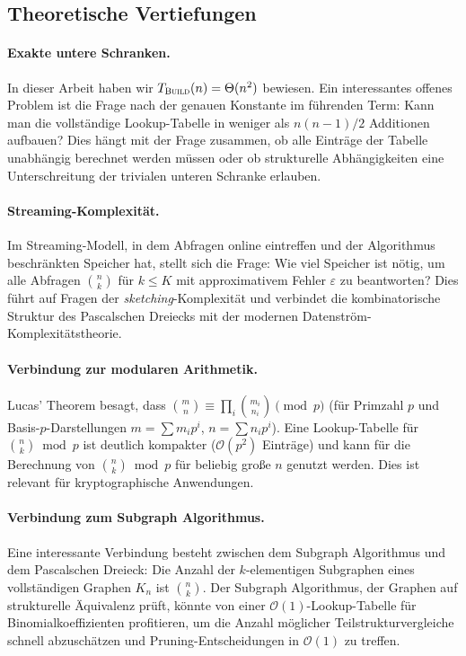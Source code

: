 ﻿\documentclass[12pt, a4paper]{article}
\newcommand{\Oh}{\mathcal{O}}
\newcommand{\build}{\textsc{Build}}
\theoremstyle{plain}
\theoremstyle{definition}
\theoremstyle{remark}
\renewcommand{\Oh}{\mathcal{O}}
\renewcommand{\build}{\textsc{Build}}
\begin{document}
\subsection{Theoretische Vertiefungen}

\paragraph{Exakte untere Schranken.}
In dieser Arbeit haben wir $T_{\build}(n) = \Theta(n^2)$ bewiesen.
Ein interessantes offenes Problem ist die Frage nach der genauen
Konstante im führenden Term: Kann man die vollständige Lookup-Tabelle
in weniger als $n(n-1)/2$ Additionen aufbauen? Dies hängt mit der
Frage zusammen, ob alle Einträge der Tabelle unabhängig berechnet
werden müssen oder ob strukturelle Abhängigkeiten eine Unterschreitung
der trivialen unteren Schranke erlauben.

\paragraph{Streaming-Komplexität.}
Im Streaming-Modell, in dem Abfragen online eintreffen und der
Algorithmus beschränkten Speicher hat, stellt sich die Frage:
Wie viel Speicher ist nötig, um alle Abfragen $\binom{n}{k}$ für
$k \le K$ mit approximativem Fehler $\varepsilon$ zu beantworten?
Dies führt auf Fragen der \emph{sketching}-Komplexität und
verbindet die kombinatorische Struktur des Pascalschen Dreiecks
mit der modernen Datenström-Komplexitätstheorie.

\paragraph{Verbindung zur modularen Arithmetik.}
Lucas' Theorem \cite{lucas1878} besagt, dass
$\binom{m}{n} \equiv \prod_{i} \binom{m_i}{n_i} \pmod{p}$
(für Primzahl $p$ und Basis-$p$-Darstellungen $m = \sum m_i p^i$,
$n = \sum n_i p^i$). Eine Lookup-Tabelle für $\binom{n}{k} \bmod p$
ist deutlich kompakter ($\Oh(p^2)$ Einträge) und kann für die
Berechnung von $\binom{n}{k} \bmod p$ für beliebig große $n$
genutzt werden. Dies ist relevant für kryptographische Anwendungen.

\paragraph{Verbindung zum Subgraph Algorithmus.}
Eine interessante Verbindung besteht zwischen dem Subgraph Algorithmus
\cite{epp2026subgraph} und dem Pascalschen Dreieck: Die Anzahl der
$k$-elementigen Subgraphen eines vollständigen Graphen $K_n$ ist
$\binom{n}{k}$. Der Subgraph Algorithmus, der Graphen auf strukturelle
Äquivalenz prüft, könnte von einer $\Oh(1)$-Lookup-Tabelle für
Binomialkoeffizienten profitieren, um die Anzahl möglicher
Teilstrukturvergleiche schnell abzuschätzen und Pruning-Entscheidungen
in $\Oh(1)$ zu treffen.
\end{document}
